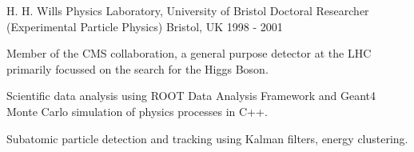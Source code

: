 \begin{cventries}
\cventry
{H. H. Wills Physics Laboratory, University of Bristol} %
{Doctoral Researcher (Experimental Particle Physics)} %
{Bristol, UK} %
{1998 - 2001} %
{
  \begin{cvitems} %
    \item {
        Member of the CMS collaboration, a general purpose detector at the LHC primarily
        focussed on the search for the Higgs Boson.}
    \item {
        Scientific data analysis using ROOT Data Analysis Framework and Geant4 Monte Carlo simulation of physics processes in C++.}
    \item {
      Subatomic particle detection and tracking using Kalman filters, energy clustering.
    }
  \end{cvitems}
}

\end{cventries}